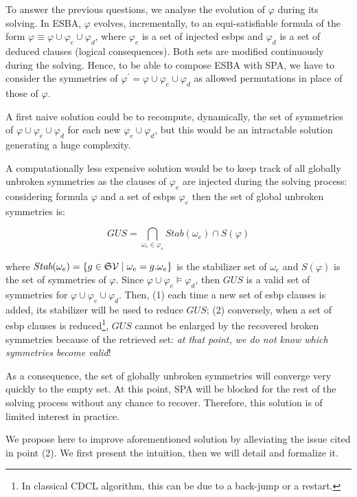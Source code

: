 To answer the previous questions, we analyse the evolution of $\varphi$ during
its solving. In ESBA, $\varphi$ evolves, incrementally, to an
equi-satisfiable formula of the form $\varphi \equiv \varphi \cup \varphi_e
\cup \varphi_d$, where $\varphi_e$ is a set of injected esbps and $\varphi_d$
is a set of deduced clauses (logical consequences). Both sets are modified continuously during the solving. Hence, to be able to compose ESBA with SPA, we have to consider the symmetries of $\varphi^\prime=\varphi \cup \varphi_e \cup \varphi_d$ as
allowed permutations in place of those of $\varphi$.


A first naive solution could be to recompute, dynamically, the set of symmetries of $\varphi
\cup \varphi_e \cup \varphi_d$ for each new $\varphi_e \cup \varphi_d$, but
this would be an intractable solution generating a huge complexity. 

A  computationally less expensive solution would be to keep track of all globally unbroken symmetries as the clauses of $\varphi_e$ are injected during the solving process: considering formula $\varphi$ and 
a set of esbps $\varphi_e$ then the set of global unbroken symmetries is:

$$GUS = \underset{\omega_e \in \varphi_e}{\bigcap}Stab(\omega_e) \cap S(\varphi)$$

 where  $Stab(\omega_e)=\{g \in \mathfrak{S}{\mathcal{V}}\mid
\omega_e=g.\omega_e\}$ is the stabilizer set of $\omega_e$ and $S(\varphi)$ is the set of symmetries of $\varphi$. Since $\varphi \cup \varphi_e  \models \varphi_d$, then $GUS$ is a valid set of symmetries for $\varphi \cup \varphi_e \cup \varphi_d$. Then, (1) each time a new set of esbp clauses is added, its stabilizer will be used to reduce $GUS$; (2) conversely, when a set of esbp clauses is reduced\footnote{In classical CDCL algorithm, this can be due to a back-jump or a restart.}, $GUS$ cannot be enlarged by the recovered broken symmetries because of the retrieved set: \textit{at that point, we do not know which symmetries become valid}! 

As a consequence, the set of globally unbroken symmetries will converge very quickly to the empty set. At this point, SPA will be blocked for the rest of the solving process without any chance to recover. Therefore, this solution is of limited interest in practice.

We propose here to improve aforementioned solution by alleviating the issue cited in point (2). We first present the intuition, then we will detail and formalize it. 

